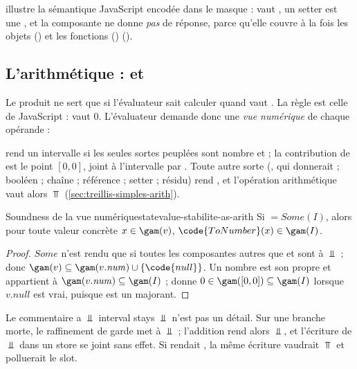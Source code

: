  illustre la sémantique JavaScript encodée dans le
masque :  vaut , un setter est une
, et la composante  ne donne \emph{pas} de
réponse, parce qu'elle couvre à la fois les objets () et les
fonctions ()
().

\subsection{L'arithmétique :  et }

Le produit ne sert que si l'évaluateur sait calculer  quand
 vaut . La règle est celle de JavaScript :
 vaut $0$. L'évaluateur demande donc une \emph{vue
numérique} de chaque opérande :


 rend un intervalle si les seules sortes peuplées sont
\og nombre\fg{} et \og {}\fg{} ; la contribution de  est
le point $[0,0]$, joint à l'intervalle par . Toute autre sorte
(, qui donnerait  ; booléen ; chaîne ; référence ;
setter ; résidu) rend , et l'opération arithmétique vaut alors
$\Top$ (\cref{sec:treillis-simples-arith}).

\begin{proposition}{Soundness de la vue numérique}{statevalue-stabilite-as-arith}
  Si  $= \mathit{Some}(I)$, alors pour toute valeur
  concrète $x \in \gam(v)$, $\code{ToNumber}(x) \in \gam(I)$.
\end{proposition}
\begin{proof}
  $\mathit{Some}$ n'est rendu que si toutes les composantes autres que
   et  sont à $\Bot$ ; donc $\gam(v) \subseteq
  \gam(v.\mathit{num}) \cup \{\code{null}\}$. Un nombre est son propre
   et appartient à $\gam(v.\mathit{num}) \subseteq
  \gam(I)$ ;  donne $0 \in \gam([0,0]) \subseteq \gam(I)$
  lorsque $v.\mathit{null}$ est vrai, puisque  est un majorant.
\end{proof}

Le commentaire \og a $\Bot$ interval stays $\Bot$\code{)}\fg{} n'est pas un
détail. Sur une branche morte, le raffinement de garde met  à
$\Bot$ ; l'addition rend alors $\Bot$, et l'écriture de $\Bot$ dans un
store se joint sans effet. Si  rendait , la même
écriture vaudrait $\Top$ et polluerait le slot.


